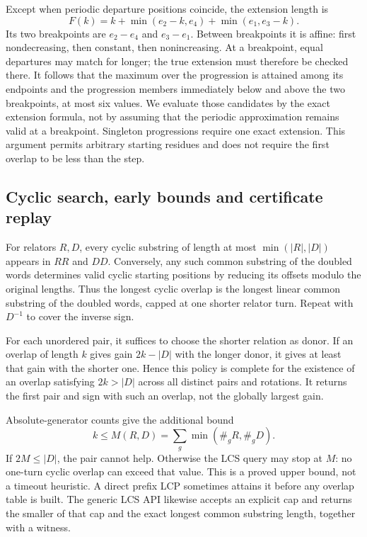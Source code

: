 Except when periodic departure positions coincide, the extension length is
\[
 F(k)=k+\min(e_2-k,e_4)+\min(e_1,e_3-k).
\]
Its two breakpoints are $e_2-e_4$ and $e_3-e_1$. Between breakpoints it
is affine: first nondecreasing, then constant, then nonincreasing. At a
breakpoint, equal departures may match for longer; the true extension
must therefore be checked there. It follows that the maximum over the
progression is attained among its endpoints and the progression members
immediately below and above the two breakpoints, at most six values.
We evaluate those candidates by the exact extension formula, not by
assuming that the periodic approximation remains valid at a breakpoint.
Singleton progressions require one exact extension. This argument permits
arbitrary starting residues and does not require the first overlap to
be less than the step.

\subsection{Cyclic search, early bounds and certificate replay}

For relators $R,D$, every cyclic substring of length at most
$\min(|R|,|D|)$ appears in $RR$ and $DD$. Conversely, any such common
substring of the doubled words determines valid cyclic starting positions
by reducing its offsets modulo the original lengths. Thus the longest
cyclic overlap is the longest linear common substring of the doubled
words, capped at one shorter relator turn. Repeat with $D^{-1}$ to cover
the inverse sign.

For each unordered pair, it suffices to choose the shorter relation as
donor. If an overlap of length $k$ gives gain $2k-|D|$ with the longer
donor, it gives at least that gain with the shorter one. Hence this policy
is complete for the existence of an overlap satisfying $2k>|D|$ across
all distinct pairs and rotations. It returns the first pair and sign
with such an overlap, not the globally largest gain.

Absolute-generator counts give the additional bound
\[
 k\le M(R,D)=\sum_g\min(\#_gR,\#_gD).
\]
If $2M\le |D|$, the pair cannot help. Otherwise the LCS query may stop
at $M$: no one-turn cyclic overlap can exceed that value. This is a proved
upper bound, not a timeout heuristic. A direct prefix LCP sometimes
attains it before any overlap table is built. The generic LCS API likewise
accepts an explicit cap and returns the smaller of that cap and the exact
longest common substring length, together with a witness.

